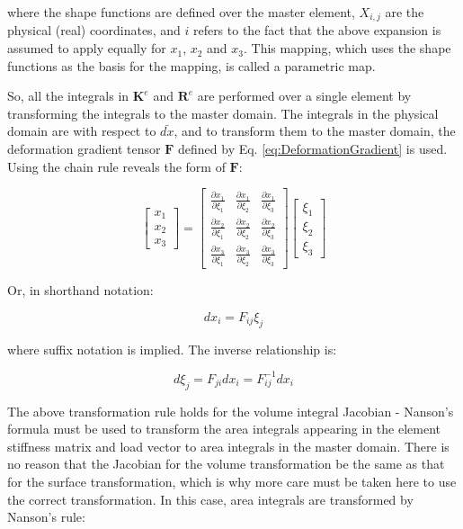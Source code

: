 \documentclass[10pt]{article}
\begin{document}
where the shape functions are defined over the master element, \(X_{i,j}\) are the physical (real) coordinates, and \(i\) refers to the fact that the above expansion is assumed to apply equally for \(x_1\), \(x_2\) and \(x_3\). This mapping, which uses the shape functions as the basis for the mapping, is called a parametric map. 

So, all the integrals in \(\textbf{K}^e\) and \(\textbf{R}^e\) are performed over a single element by transforming the integrals to the master domain. The integrals in the physical domain are with respect to \(\bar{dx}\), and to transform them to the master domain, the deformation gradient tensor \(\textbf{F}\) defined by Eq. \eqref{eq:DeformationGradient} is used. Using the chain rule reveals the form of \(\textbf{F}\):

\begin{equation}
\label{eq:FForm}
\begin{bmatrix}x_1\\x_2\\x_3\end{bmatrix}=
\begin{bmatrix}\frac{\partial x_1}{\partial \xi_1}&\frac{\partial x_1}{\partial \xi_2}&\frac{\partial x_1}{\partial \xi_3}\\
\frac{\partial x_2}{\partial \xi_1}&\frac{\partial x_2}{\partial \xi_2}&\frac{\partial x_2}{\partial \xi_3}\\
\frac{\partial x_3}{\partial \xi_1}&\frac{\partial x_3}{\partial \xi_2}&\frac{\partial x_3}{\partial \xi_3}\end{bmatrix}
\begin{bmatrix}\xi_1\\\xi_2\\\xi_3\end{bmatrix}
\end{equation}

Or, in shorthand notation:

\begin{equation}
dx_i=F_{ij}\xi_j
\end{equation}

where suffix notation is implied. The inverse relationship is:

\begin{equation}
d\xi_j=F_{ji}dx_i=F_{ij}^{-1}dx_i
\end{equation}

The above transformation rule holds for the volume integral Jacobian - Nanson's formula must be used to transform the area integrals appearing in the element stiffness matrix and load vector to area integrals in the master domain. There is no reason that the Jacobian for the volume transformation be the same as that for the surface transformation, which is why more care must be taken here to use the correct transformation. In this case, area integrals are transformed by Nanson's rule:
\end{document}
